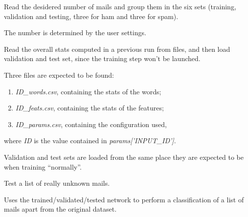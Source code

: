 \documentclass[letterpaper,10pt,english]{sphinxmanual}
\begin{document}
\begin{fulllineitems}
\begin{fulllineitems}
\label{index:naive_bayes.Bayes.load_mails}
Read the desidered number of mails and group them in the six sets
(training, validation and testing, three for ham and three for spam).

The number is determined by the user settings.

\end{fulllineitems}


\begin{fulllineitems}
\label{index:naive_bayes.Bayes.read_bayes}
Read the overall stats computed in a previous run from files, and then
load validation and test set, since the training step won't be launched.

Three files are expected to be found:
\begin{enumerate}
\item {} 
\emph{ID\_words.csv}, containing the stats of the words;

\item {} 
\emph{ID\_feats.csv}, containing the stats of the features;

\item {} 
\emph{ID\_params.csv}, containing the configuration used,

\end{enumerate}

where \emph{ID} is the value contained in \emph{params{[}'INPUT\_ID'{]}}.

Validation and test sets are loaded from the same place they are
expected to be when training ``normally''.

\end{fulllineitems}


\begin{fulllineitems}
\label{index:naive_bayes.Bayes.test}
Test a list of really unknown mails.

Uses the trained/validated/tested network to perform a classification
of a list of mails apart from the original dataset.

\end{fulllineitems}



\end{fulllineitems}
\end{document}
